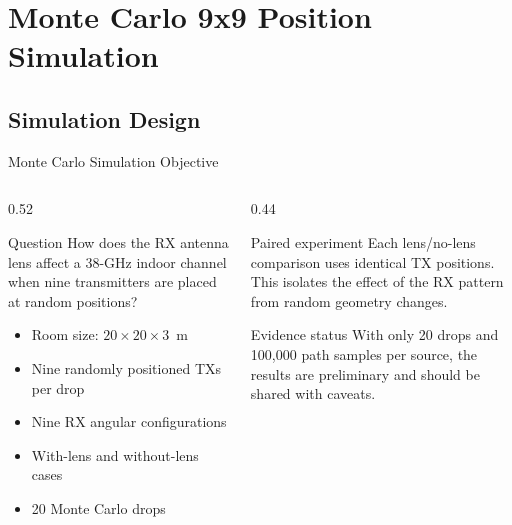 
\section{Monte Carlo 9x9 Position Simulation}

\subsection{Simulation Design}

\begin{frame}[t,shrink=10]{Monte Carlo Simulation Objective}
    \begin{columns}[T,onlytextwidth]
        \begin{column}{0.52\textwidth}
            \begin{block}{Question}
                How does the RX antenna lens affect a 38-GHz indoor channel
                when nine transmitters are placed at random positions?
            \end{block}
            \begin{itemize}
                \item Room size: $20\times20\times3$~m
                \item Nine randomly positioned TXs per drop
                \item Nine RX angular configurations
                \item With-lens and without-lens cases
                \item 20 Monte Carlo drops
            \end{itemize}
        \end{column}
        \begin{column}{0.44\textwidth}
            \begin{exampleblock}{Paired experiment}
                Each lens/no-lens comparison uses identical TX positions.
                This isolates the effect of the RX pattern from random
                geometry changes.
            \end{exampleblock}
            \begin{alertblock}{Evidence status}
                With only 20 drops and 100,000 path samples per source, the
                results are preliminary and should be shared with caveats.
            \end{alertblock}
        \end{column}
    \end{columns}
\end{frame}

